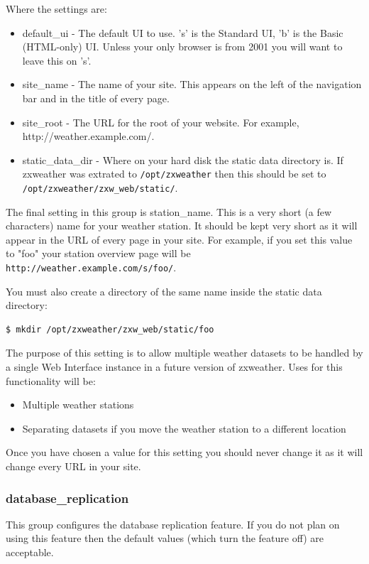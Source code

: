 \documentclass[a4paper,10pt,draft]{book}
\begin{document}
Where the settings are:
\begin{itemize}
\item default\_ui - The default UI to use. 's' is the Standard UI, 'b' is the Basic (HTML-only) UI. Unless your only browser is from 2001 you will want to leave this on 's'.
\item site\_name - The name of your site. This appears on the left of the navigation bar and in the title of every page.
\item site\_root - The URL for the root of your website. For example, http://weather.example.com/.
\item static\_data\_dir - Where on your hard disk the static data directory is. If zxweather was extrated to \verb|/opt/zxweather| then this should be set to \verb|/opt/zxweather/zxw_web/static/|.
\end{itemize}

The final setting in this group is station\_name. This is a very short (a few characters) name for your weather station. It should be kept very short as it will appear in the URL of every page in your site. For example, if you set this value to "foo" your station overview page will be \verb|http://weather.example.com/s/foo/|.

You must also create a directory of the same name inside the static data directory:
\begin{verbatim}
$ mkdir /opt/zxweather/zxw_web/static/foo
\end{verbatim}

The purpose of this setting is to allow multiple weather datasets to be handled by a single Web Interface instance in a future version of zxweather. Uses for this functionality will be:
\begin{itemize}
\item Multiple weather stations
\item Separating datasets if you move the weather station to a different location
\end{itemize}

Once you have chosen a value for this setting you should never change it as it will change every URL in your site.

\subsubsection{database\_replication}
This group configures the database replication feature. If you do not plan on using this feature then the default values (which turn the feature off) are acceptable.
\end{document}
